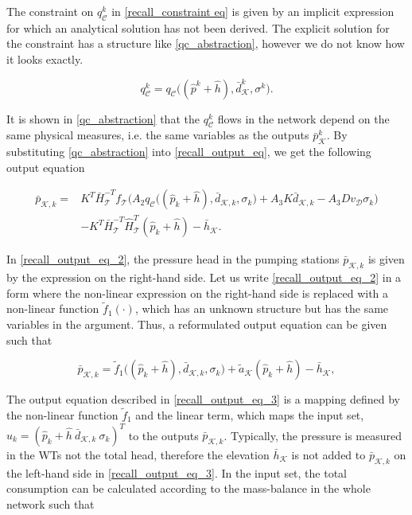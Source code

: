 The constraint on $q^{k}_{\mathcal{C}}$ in \eqref{recall_constraint eq} is given by an implicit expression for which an analytical solution has not been derived. The explicit solution for the constraint has a structure like \eqref{qc_abstraction}, however we do not know how it looks exactly.

 \begin{equation}
\label{qc_abstraction}
q^{k}_{\mathcal{C}} = q_{\mathcal{C}} \big( (\hat{p}^{k} + \hat{h}),\bar{d}^{k}_{\mathcal{K}}, \sigma^{k} \big).
\end{equation} 

It is shown in \eqref{qc_abstraction} that the $q^{k}_{\mathcal{C}}$ flows in the network depend on the same physical measures, i.e. the same variables as the outputs $\bar{p}^{k}_{\mathcal{K}}$. By substituting \eqref{qc_abstraction} into \eqref{recall_output_eq}, we get the following output equation

\vspace{-4mm}
\begin{align}
  \label{recall_output_eq_2}
      \bar{p}_{\mathcal{K},k}  = & \nonumber K^T \bar{H}^{-T}_{\mathcal{T}}f_{\mathcal{T}} \big (A_2 q_{\mathcal{C}}\big ((\hat{p}_k + \hat{h}),\bar{d}_{\mathcal{K},k}, \sigma_k \big) + A_3 K \bar{d}_{\mathcal{K},k} - A_3 D v_{\mathcal{D}} \sigma_k \big)   \\ &  - K^T\bar{H}^{-T}_{\mathcal{T}}\hat{H}^{T}_{\mathcal{T}} (\hat{p}_k + \hat{h}) - \bar{h}_{\mathcal{K}} .
\end{align}

\vspace{-4mm}
In \eqref{recall_output_eq_2}, the pressure head in the pumping stations $\bar{p}_{\mathcal{K},k}$ is given by the expression on the right-hand side. Let us write \eqref{recall_output_eq_2} in a form where the non-linear expression on the right-hand side is replaced with a non-linear function $\tilde{f}_1(\cdot)$, which has an unknown structure but has the same variables in the argument. Thus, a reformulated output equation can be given such that 

 \begin{equation}
  \label{recall_output_eq_3}
     \bar{p}_{\mathcal{K},k}  = \tilde{f}_1 \big((\hat{p}_k + \hat{h}),\bar{d}_{\mathcal{K},k}, \sigma_k\big) + \tilde{a}_{\mathcal{K}} (\hat{p}_k + \hat{h}) - \bar{h}_{\mathcal{K}}, 
\end{equation} 

The output equation described in \eqref{recall_output_eq_3} is a mapping defined by the non-linear function $\tilde{f}_1$ and the linear term, which maps the input set, $u_k = ( \hat{p}_k\!+\!\hat{h} \ \bar{d}_{\mathcal{K},k} \ \sigma_k )^T$ to the outputs $\bar{p}_{\mathcal{K},k} $. Typically, the pressure is measured in the WTs not the total head, therefore the elevation $\bar{h}_{\mathcal{K}}$ is not added to $\bar{p}_{\mathcal{K},k}$ on the left-hand side in \eqref{recall_output_eq_3}. In the input set, the total consumption can be calculated according to the mass-balance in the whole network such that

